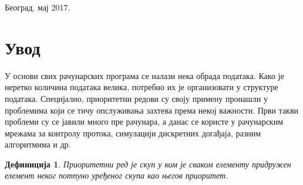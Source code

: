 \documentclass[11pt, a4paper]{article}
\newtheorem{definicijaB}{\selectlanguage{russian} Дефиниција} [section]
\theoremstyle{remark}
\numberwithin{equation}{section}
\begin{document}
\begin{titlepage}
		
		
		{\large Београд, мај 2017.}\\[2.5cm] %
		
		
		
		
		\vfill %
		
	\end{titlepage}

	
	\renewcommand*\contentsname{Садржај}
	\tableofcontents
	\newpage
	
	
	\section{Увод}
	У основи свих рачунарских програма се налази нека обрада података. Како је неретко количина података велика, потребно их је организовати у структуре података. Специјално, приоритетни редови су своју примену пронашли у проблемима који се тичу опслуживања захтева према некој важности. Први такви проблеми су се јавили много пре рачунара, а данас се користе у рачунарским мрежама за контролу протока, симулацији дискретних догађаја, разним алгоритмима и др. \\
	
	\begin{definicijaB}
		\normalfont
		Приоритетни ред је скуп у ком је сваком елементу придружен елемент неког потпуно уређеног скупа као његов \textit{приоритет}.
	\end{definicijaB}
	
\end{document}
